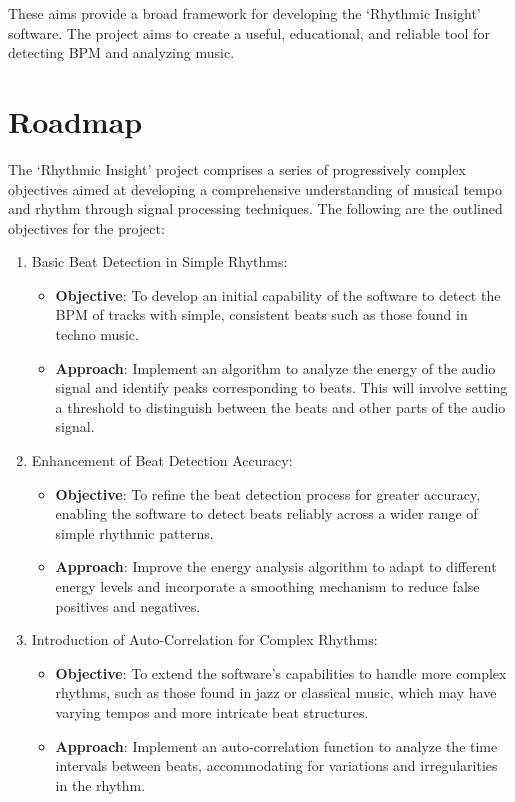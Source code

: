 \documentclass[a4paper,12pt,oneside]{article}
\def\tightlist{%
  \setlength{\itemsep}{0pt}\setlength{\parskip}{0pt}}
\begin{document}
These aims provide a broad framework for developing the `Rhythmic
Insight' software. The project aims to create a useful, educational, and
reliable tool for detecting BPM and analyzing music.

\section{Roadmap}

The `Rhythmic Insight' project comprises a series of progressively
complex objectives aimed at developing a comprehensive understanding of
musical tempo and rhythm through signal processing techniques. The
following are the outlined objectives for the project:

\begin{enumerate}
\def\labelenumi{\arabic{enumi}.}
\item
  Basic Beat Detection in Simple Rhythms:
  \begin{itemize}
  \tightlist
  \item
    \textbf{Objective}: To develop an initial capability of the software
    to detect the BPM of tracks with simple, consistent beats such as
    those found in techno music.
  \item
    \textbf{Approach}: Implement an algorithm to analyze the energy of the
    audio signal and identify peaks corresponding to beats. This will
    involve setting a threshold to distinguish between the beats and other
    parts of the audio signal.
  \end{itemize}

\setcounter{enumi}{1}
\item
  Enhancement of Beat Detection Accuracy:
  \begin{itemize}
  \tightlist
  \item
    \textbf{Objective}: To refine the beat detection process for greater
    accuracy, enabling the software to detect beats reliably across a
    wider range of simple rhythmic patterns.
  \item
    \textbf{Approach}: Improve the energy analysis algorithm to adapt to
    different energy levels and incorporate a smoothing mechanism to
    reduce false positives and negatives.
  \end{itemize}

\setcounter{enumi}{2}
\item
  Introduction of Auto-Correlation for Complex Rhythms:
  \begin{itemize}
  \tightlist
  \item
    \textbf{Objective}: To extend the software's capabilities to handle
    more complex rhythms, such as those found in jazz or classical music,
    which may have varying tempos and more intricate beat structures.
  \item
    \textbf{Approach}: Implement an auto-correlation function to analyze
    the time intervals between beats, accommodating for variations and
    irregularities in the rhythm.
  \end{itemize}


\end{enumerate}
\end{document}
